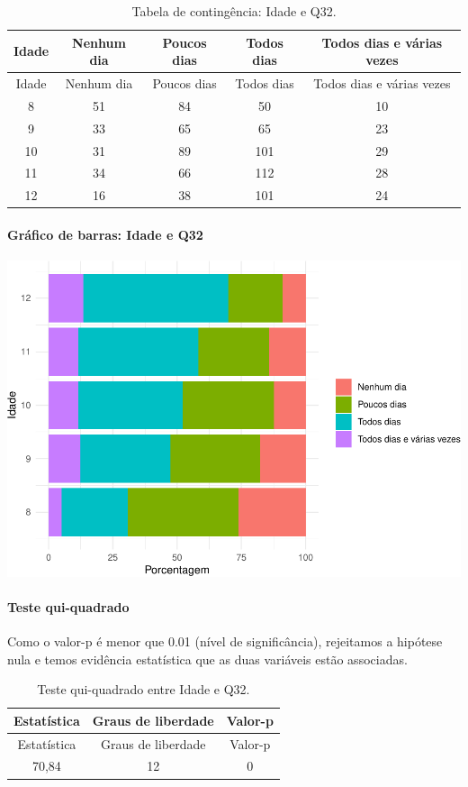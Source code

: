 \documentclass[]{article}
\let\oldparagraph\paragraph
\renewcommand{\paragraph}[1]{\oldparagraph{#1}\mbox{}}
\begin{document}
\begin{longtable}[]{@{}ccccc@{}}
\caption{\label{tab:unnamed-chunk-1095}Tabela de contingência: Idade e Q32.}\tabularnewline
\toprule
Idade & Nenhum dia & Poucos dias & Todos dias & Todos dias e várias vezes\tabularnewline
\midrule
\endfirsthead
\toprule
Idade & Nenhum dia & Poucos dias & Todos dias & Todos dias e várias vezes\tabularnewline
\midrule
\endhead
8 & 51 & 84 & 50 & 10\tabularnewline
9 & 33 & 65 & 65 & 23\tabularnewline
10 & 31 & 89 & 101 & 29\tabularnewline
11 & 34 & 66 & 112 & 28\tabularnewline
12 & 16 & 38 & 101 & 24\tabularnewline
\bottomrule
\end{longtable}

\hypertarget{gruxe1fico-de-barras-idade-e-q32}{%
\paragraph{Gráfico de barras: Idade e Q32}\label{gruxe1fico-de-barras-idade-e-q32}}

\begin{center}\includegraphics[width=0.75\linewidth]{relatorio_covid19_files/figure-latex/unnamed-chunk-1096-1} \end{center}

\hypertarget{teste-qui-quadrado-94}{%
\paragraph{Teste qui-quadrado}\label{teste-qui-quadrado-94}}

Como o valor-p é menor que 0.01 (nível de significância), rejeitamos a hipótese nula e temos evidência estatística que as duas variáveis estão associadas.

\begin{longtable}[]{@{}ccc@{}}
\caption{\label{tab:unnamed-chunk-1098}Teste qui-quadrado entre Idade e Q32.}\tabularnewline
\toprule
Estatística & Graus de liberdade & Valor-p\tabularnewline
\midrule
\endfirsthead
\toprule
Estatística & Graus de liberdade & Valor-p\tabularnewline
\midrule
\endhead
70,84 & 12 & 0\tabularnewline
\bottomrule
\end{longtable}
\end{document}

